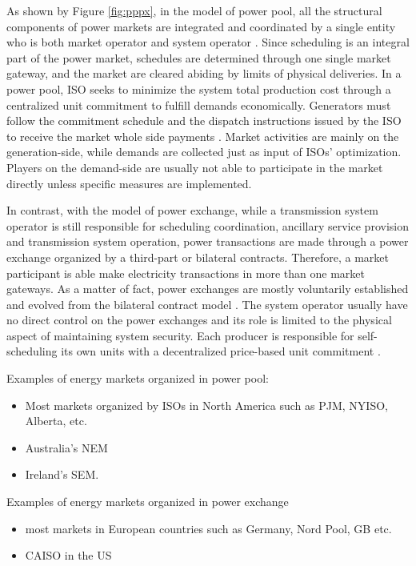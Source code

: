 As shown by Figure \ref{fig:pppx}, in the model of power pool, all the structural components of power markets are integrated and coordinated by a single entity who is both market operator and system operator  \cite{Srivastava2011,Barroso2005}. Since scheduling is an integral part of the power market, schedules are determined through one single market gateway, and the market are cleared abiding by limits of physical deliveries.  
In a power pool, ISO seeks to minimize the system total production cost through a centralized unit commitment to fulfill demands economically. Generators must follow the commitment schedule and the dispatch instructions issued by the ISO to receive the market whole side payments \cite{Kardakos2013}. Market activities are mainly on the generation-side, while demands are collected just as input of ISOs' optimization. Players on the demand-side are usually not able to participate in the market directly unless specific measures are implemented.

In contrast, with the model of power exchange, while a transmission system operator is still responsible for scheduling coordination, ancillary service provision and transmission system operation, power transactions are made through a power exchange organized by a third-part or bilateral contracts. Therefore, a market participant is able make electricity transactions in more than one market gateways. As a matter of fact, power exchanges are mostly voluntarily established and evolved from the bilateral contract model \cite{Barroso2005}. The system operator usually have no direct control on the power exchanges and its role is limited to the physical aspect of maintaining system security. Each producer is responsible for self-scheduling its own units with a decentralized price-based unit commitment \cite{Kardakos2013}.


Examples of energy markets organized in power pool:
	\begin{itemize}
		\item Most markets organized by ISOs in North America such as PJM, NYISO, Alberta, etc.
		\item Australia's NEM
		\item Ireland's SEM.
	\end{itemize}

Examples of energy markets organized in power exchange
	\begin{itemize}
		\item most markets in European countries such as Germany, Nord Pool, GB etc.
		\item CAISO in the US
	\end{itemize}

